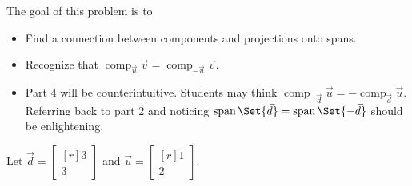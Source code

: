 \documentclass{problemset}
\DeclareMathOperator{\Span}{span}
\DeclareMathOperator{\Comp}{comp}
\newcommand{\mat}[1]{\begin{bmatrix*}[r]#1\end{bmatrix*}}
\newcommand{\displayonlynewpage}{\begin{displayonly}\newpage\end{displayonly}}
\begin{document}
	\displayonlynewpage
	\question
	\begin{annotation}
		\begin{goals}

			The goal of this problem is to
			\begin{itemize}
				\item Find a connection between components and projections
					onto spans.
				\item Recognize that $\Comp_{\vec u}\vec v=\Comp_{-\vec u}\vec v$.
			\end{itemize}
		\end{goals}

		\begin{notes}
			\begin{itemize}
				\item Part 4 will be counterintuitive. Students may
					think $\Comp_{-\vec d}\vec u=-\Comp_{\vec d}\vec u$.
					Referring back to part 2 and noticing $\Span\Set{\vec d}=\Span\Set{-\vec d}$
					should be enlightening.
			\end{itemize}
		\end{notes}
	\end{annotation}
	Let $\vec d=\mat{3\\3}$ and $\vec u=\mat{1\\2}$.
\end{document}
